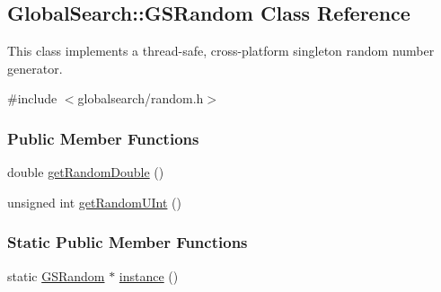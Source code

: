 \hypertarget{classGlobalSearch_1_1GSRandom}{}\subsection{Global\+Search\+:\+:G\+S\+Random Class Reference}
\label{classGlobalSearch_1_1GSRandom}


This class implements a thread-\/safe, cross-\/platform singleton random number generator.  




{\ttfamily \#include $<$globalsearch/random.\+h$>$}

\subsubsection*{Public Member Functions}
\begin{DoxyCompactItemize}
\item 
double \hyperlink{classGlobalSearch_1_1GSRandom_ae648223ac2769459d66f446ac862955e}{get\+Random\+Double} ()
\item 
unsigned int \hyperlink{classGlobalSearch_1_1GSRandom_a225a2c9598d7d6636afecacdd7750228}{get\+Random\+U\+Int} ()
\end{DoxyCompactItemize}
\subsubsection*{Static Public Member Functions}
\begin{DoxyCompactItemize}
\item 
static \hyperlink{classGlobalSearch_1_1GSRandom}{G\+S\+Random} $\ast$ \hyperlink{classGlobalSearch_1_1GSRandom_a19c0a95c0f92f3ffedfbcb4e4f15a782}{instance} ()
\end{DoxyCompactItemize}
